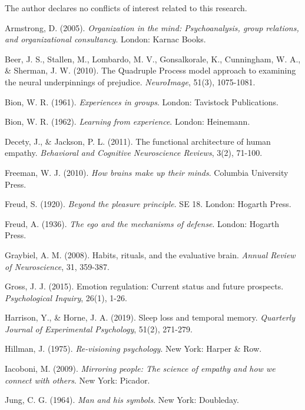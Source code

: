 \documentclass[11pt,a4paper]{article}
\begin{document}
The author declares no conflicts of interest related to this research.

\begin{thebibliography}{99}

Armstrong, D. (2005). \textit{Organization in the mind: Psychoanalysis, group relations, and organizational consultancy}. London: Karnac Books.

Beer, J. S., Stallen, M., Lombardo, M. V., Gonsalkorale, K., Cunningham, W. A., \& Sherman, J. W. (2010). The Quadruple Process model approach to examining the neural underpinnings of prejudice. \textit{NeuroImage}, 51(3), 1075-1081.

Bion, W. R. (1961). \textit{Experiences in groups}. London: Tavistock Publications.

Bion, W. R. (1962). \textit{Learning from experience}. London: Heinemann.

Decety, J., \& Jackson, P. L. (2011). The functional architecture of human empathy. \textit{Behavioral and Cognitive Neuroscience Reviews}, 3(2), 71-100.

Freeman, W. J. (2010). \textit{How brains make up their minds}. Columbia University Press.

Freud, S. (1920). \textit{Beyond the pleasure principle}. SE 18. London: Hogarth Press.

Freud, A. (1936). \textit{The ego and the mechanisms of defense}. London: Hogarth Press.

Graybiel, A. M. (2008). Habits, rituals, and the evaluative brain. \textit{Annual Review of Neuroscience}, 31, 359-387.

Gross, J. J. (2015). Emotion regulation: Current status and future prospects. \textit{Psychological Inquiry}, 26(1), 1-26.

Harrison, Y., \& Horne, J. A. (2019). Sleep loss and temporal memory. \textit{Quarterly Journal of Experimental Psychology}, 51(2), 271-279.

Hillman, J. (1975). \textit{Re-visioning psychology}. New York: Harper \& Row.

Iacoboni, M. (2009). \textit{Mirroring people: The science of empathy and how we connect with others}. New York: Picador.

Jung, C. G. (1964). \textit{Man and his symbols}. New York: Doubleday.


\end{thebibliography}
\end{document}
